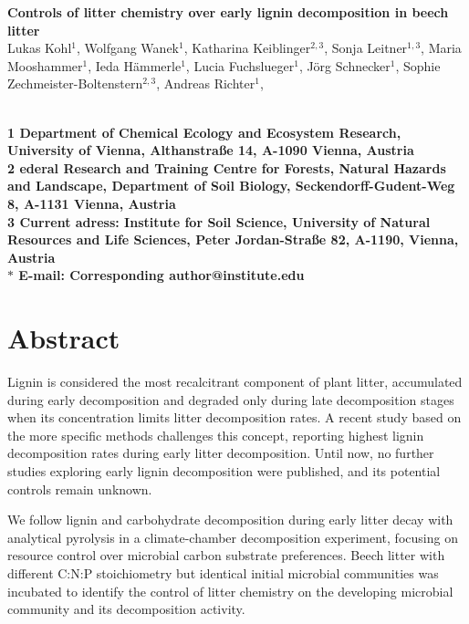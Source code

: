 \documentclass[10pt]{article}
\date{}
\begin{document}
\begin{flushleft}
{\Large
\textbf{Controls of litter chemistry over early lignin decomposition in beech litter}
}
\\
Lukas Kohl$^{1}$, %
Wolfgang Wanek$^{1}$, 
Katharina Keiblinger$^{2,3}$, 
Sonja Leitner$^{1,3}$, 
Maria Mooshammer$^{1}$, 
Ieda H\"ammerle$^{1}$, 
Lucia Fuchslueger$^{1}$, 
J\"org Schnecker$^{1}$, 
Sophie Zechmeister-Boltenstern$^{2,3}$, 
Andreas Richter$^{1}$, 

\\
\bf{1} Department of Chemical Ecology and Ecosystem Research, University of Vienna, Althanstra\ss e 14, A-1090 Vienna, Austria
\\
\bf{2} ederal Research and Training Centre for Forests, Natural Hazards and Landscape, Department of Soil Biology, Seckendorff-Gudent-Weg 8, A-1131 Vienna, Austria
\\
\bf{3} Current adress: Institute for Soil Science, University of Natural Resources and Life Sciences, Peter Jordan-Stra\ss e 82, A-1190, Vienna, Austria
\\
$\ast$ E-mail: Corresponding author@institute.edu
\end{flushleft}

\section*{Abstract}

Lignin is considered the most recalcitrant component of plant litter, accumulated during early decomposition and degraded only during late decomposition stages when its concentration limits litter decomposition rates. A recent study based on the more specific methods challenges this concept, reporting highest lignin decomposition rates during early litter decomposition. Until now, no further studies exploring early lignin decomposition were published, and its potential controls remain unknown.

We follow lignin and carbohydrate decomposition during early litter decay with analytical pyrolysis in a climate-chamber decomposition experiment, focusing on resource control over microbial carbon substrate preferences. Beech litter with different C:N:P stoichiometry but identical initial microbial communities was incubated to identify the control of litter chemistry on the developing microbial community and its decomposition activity. 
\end{document}
